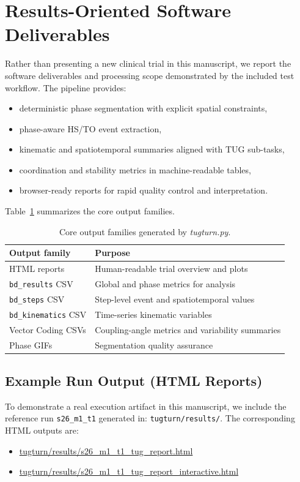 \documentclass{article}
\begin{document}
\section{Results-Oriented Software Deliverables}
Rather than presenting a new clinical trial in this manuscript, we report the software deliverables and processing scope demonstrated by the included test workflow. The pipeline provides:
\begin{itemize}
  \item deterministic phase segmentation with explicit spatial constraints,
  \item phase-aware HS/TO event extraction,
  \item kinematic and spatiotemporal summaries aligned with TUG sub-tasks,
  \item coordination and stability metrics in machine-readable tables,
  \item browser-ready reports for rapid quality control and interpretation.
\end{itemize}

Table~\ref{tab:deliverables} summarizes the core output families.

\begin{table}[htbp]
  \centering
  \caption{Core output families generated by \textit{tugturn.py}.}
  \label{tab:deliverables}
  \begin{tabular}{ll}
    \toprule
    \textbf{Output family} & \textbf{Purpose} \\
    \midrule
    HTML reports & Human-readable trial overview and plots \\
    \texttt{bd\_results} CSV & Global and phase metrics for analysis \\
    \texttt{bd\_steps} CSV & Step-level event and spatiotemporal values \\
    \texttt{bd\_kinematics} CSV & Time-series kinematic variables \\
    Vector Coding CSVs & Coupling-angle metrics and variability summaries \\
    Phase GIFs & Segmentation quality assurance \\
    \bottomrule
  \end{tabular}
\end{table}

\subsection{Example Run Output (HTML Reports)}
To demonstrate a real execution artifact in this manuscript, we include the reference run
\texttt{s26\_m1\_t1} generated in:
\texttt{tugturn/results/}. The corresponding HTML outputs are:
\begin{itemize}
  \item \url{tugturn/results/s26_m1_t1_tug_report.html}
  \item \url{tugturn/results/s26_m1_t1_tug_report_interactive.html}
\end{itemize}
\end{document}
